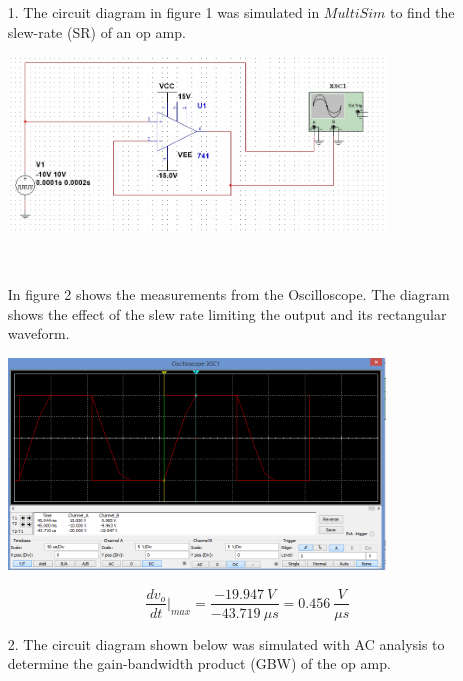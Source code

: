 \documentclass[11pt,a4paper]{article}
\begin{document}
\begin{enumerate}
  \item[1.]
  The circuit diagram in figure 1 was simulated in $MultiSim$ to find the slew-rate (SR) of an op amp.\\
    \begin{minipage}{\linewidth}
      \centering       
       \includegraphics[width=10cm]{Task1-1Circuit}\\
    \end{minipage}\\
\pagebreak
\pagebreak

In figure 2 shows the measurements from the Oscilloscope. The diagram shows the effect of the slew rate limiting the output and its rectangular waveform.\\
	
    \begin{minipage}{\linewidth}
      \centering       
       \includegraphics[width=10cm]{Task1-1-Oscilloscope}\\
    \end{minipage}
$$ \dfrac{dv_{o}}{dt}|_{max} = \dfrac{-19.947 \ V}{-43.719\ \mu s} = 0.456\ \frac{V}{\mu s} $$
  \item[2.]
  The circuit diagram shown below was simulated with AC analysis to determine the gain-bandwidth product (GBW) of the op amp.  
  

\end{enumerate}
\end{document}
